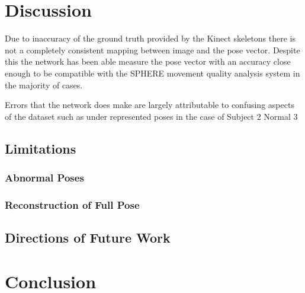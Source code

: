 \documentclass[11pt]{article} %
\begin{document}
\section{Discussion}
\label{sec:discussion}


Due to inaccuracy of the ground truth provided by the Kinect skeletons there is not a completely consistent mapping between image and the pose vector. Despite this the network has been able measure the pose vector with an accuracy close enough to be compatible with the SPHERE movement quality analysis system in the majority of cases. 

Errors that the network does make are largely attributable to confusing aspects of the dataset such as under represented poses in the case of Subject 2 Normal 3

\subsection{Limitations}

\subsubsection{Abnormal Poses}
\label{sec:abnormals}

\subsubsection{Reconstruction of Full Pose}

\subsection{Directions of Future Work}


\section{Conclusion}







%
\end{document}
